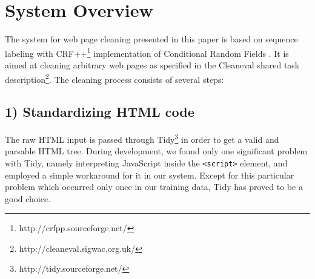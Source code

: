 \documentclass[12pt,a4paper, fleqn, leqno, twoside]{article}
\newcommand{\mysubsection}[1]{\subsection*{\bf #1}}
\begin{document}
\section{System Overview}




% 
% 
% 
% 

The system for web page cleaning presented in this paper is based on sequence labeling with CRF++\footnote{http://crfpp.sourceforge.net/} implementation of Conditional Random Fields \cite{Lafferty2001}. It is aimed at cleaning arbitrary web pages as specified in the Cleaneval shared task
description\footnote{http://cleaneval.sigwac.org.uk/}.  The cleaning process consists of several steps:

\mysubsection{1) Standardizing HTML code}

The raw HTML input is passed through Tidy\footnote{http://tidy.sourceforge.net/}
in order to get a valid and parsable HTML tree. During development, we found only
one significant problem with Tidy, namely interpreting JavaScript inside the {\tt <script>} element, and employed a simple  workaround for it in our system. Except for this particular problem which occurred only once in our training data, Tidy has proved to be a good choice.
\end{document}
